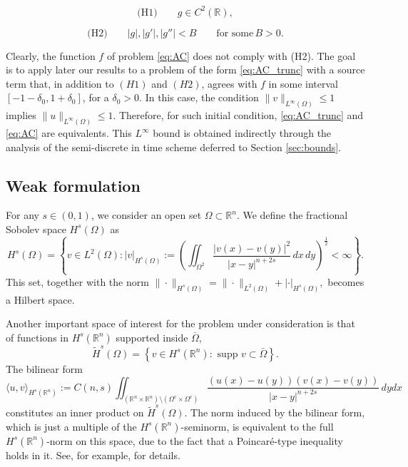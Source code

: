 \documentclass{amsart}
\newcommand{\rn}{{\mathbb{R}^n}}
\newcommand{\W}{\Omega}
\newcommand{\fmonio}{g}
\theoremstyle{remark}
\theoremstyle{definition}
\numberwithin{equation}{section}
\begin{document}
\begin{equation} \text{(H1)} \qquad \fmonio \in C^2(\mathbb{R}),
\label{H1}
\end{equation}

  \begin{equation} \text{(H2)} \qquad  |\fmonio|,|\fmonio'|,|\fmonio''|<B \qquad \text{for some} \, B>0.
\label{H2} 
\end{equation}
 
Clearly, the function $f$ of problem \eqref{eq:AC} does not comply with (H2). The goal is to apply later our results  to a problem  of the form \eqref{eq:AC_trunc} with a source term that, in addition to $(H1)$ and $(H2)$, agrees with $f$ in some interval  $[-1 - \delta_0 , 1 + \delta_0]$, for a $\delta_0>0$. In this case,  the condition $\|v\|_{L^{\infty}(\W)} \leq 1$ implies $\|u\|_{L^{\infty}(\W)} \leq 1$. Therefore, for such initial condition, \eqref{eq:AC_trunc} and \eqref{eq:AC} are equivalents. This  $L^\infty$ bound is obtained indirectly  through the analysis of the semi-discrete in time scheme deferred to Section \ref{sec:bounds}.            

\subsection{Weak formulation}
For any $s \in(0,1)$, we consider an open set $\W \subset \rn$. We  define the fractional Sobolev space $H^s(\W)$ as
\[
H^s(\W) = \left\{ v \in L^2(\W) \colon |v|_{H^s(\W)} := \left( \iint_{\W^2}  \frac{|v(x)-v(y)|^2}{|x-y|^{n+2s}} \, dx \, dy \right)^{\frac12} < \infty \right\}.
\]
This set, together with the norm $\|\cdot\|_{H^s(\W)} = \|\cdot\|_{L^2(\W)} + |\cdot|_{H^s(\W)} ,$ becomes a Hilbert space. 

 
Another important space of interest for the problem under consideration is that of functions in $H^s(\rn)$ supported inside $\overline \W$, 
\[
\widetilde{H}^s (\W) = \left\{ v \in H^s(\rn) \colon \text{ supp } v \subset \bar{\W} \right\}.
\]	
The bilinear form 
\begin{equation}
 \label{eq:pinte}
\langle u , v \rangle_{H^s(\rn)} := C(n,s) \iint_{(\rn \times \rn) \setminus (\W^c \times \W^c)} \frac{(u(x)-u(y)) (v(x)-v(y))}{|x-y|^{n+2s}} \, dy dx 
\end{equation}
constitutes an inner product on $\widetilde{H}^s(\W)$. The norm induced by the bilinear form, which is just a multiple of the $H^s(\rn)$-seminorm, is equivalent to the full $H^s(\rn)$-norm on this space, due to the fact that a Poincar\'e-type inequality holds in it. See, for example, \cite{AcostaBorthagaray} for details.
\end{document}

